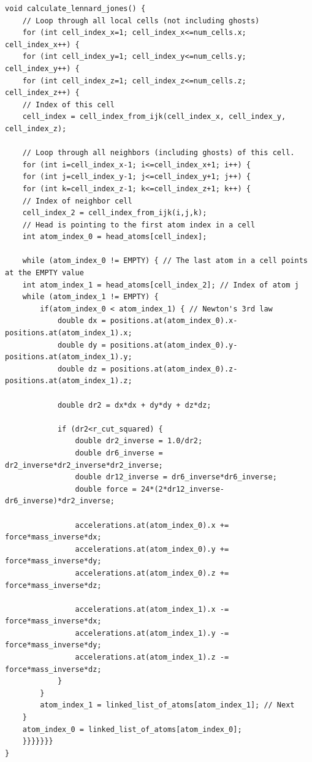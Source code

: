 \begin{lstlisting}[caption=Implementation of the Lennard-Jones force. The code loops over all cells and their neighbors computing the forces between all the atoms in neighboring cells., label=lst:md_lennard_jones]
void calculate_lennard_jones() {
    // Loop through all local cells (not including ghosts)
    for (int cell_index_x=1; cell_index_x<=num_cells.x; cell_index_x++) {
    for (int cell_index_y=1; cell_index_y<=num_cells.y; cell_index_y++) {
    for (int cell_index_z=1; cell_index_z<=num_cells.z; cell_index_z++) {
    // Index of this cell
    cell_index = cell_index_from_ijk(cell_index_x, cell_index_y, cell_index_z);

    // Loop through all neighbors (including ghosts) of this cell.
    for (int i=cell_index_x-1; i<=cell_index_x+1; i++) {
    for (int j=cell_index_y-1; j<=cell_index_y+1; j++) {
    for (int k=cell_index_z-1; k<=cell_index_z+1; k++) {
    // Index of neighbor cell
    cell_index_2 = cell_index_from_ijk(i,j,k);
    // Head is pointing to the first atom index in a cell
    int atom_index_0 = head_atoms[cell_index]; 

    while (atom_index_0 != EMPTY) { // The last atom in a cell points at the EMPTY value
    int atom_index_1 = head_atoms[cell_index_2]; // Index of atom j
    while (atom_index_1 != EMPTY) {
        if(atom_index_0 < atom_index_1) { // Newton's 3rd law
            double dx = positions.at(atom_index_0).x-positions.at(atom_index_1).x;
            double dy = positions.at(atom_index_0).y-positions.at(atom_index_1).y;
            double dz = positions.at(atom_index_0).z-positions.at(atom_index_1).z;
            
            double dr2 = dx*dx + dy*dy + dz*dz;

            if (dr2<r_cut_squared) {
                double dr2_inverse = 1.0/dr2;
                double dr6_inverse = dr2_inverse*dr2_inverse*dr2_inverse;
                double dr12_inverse = dr6_inverse*dr6_inverse;
                double force = 24*(2*dr12_inverse-dr6_inverse)*dr2_inverse;

                accelerations.at(atom_index_0).x += force*mass_inverse*dx;
                accelerations.at(atom_index_0).y += force*mass_inverse*dy;
                accelerations.at(atom_index_0).z += force*mass_inverse*dz;

                accelerations.at(atom_index_1).x -= force*mass_inverse*dx;
                accelerations.at(atom_index_1).y -= force*mass_inverse*dy;
                accelerations.at(atom_index_1).z -= force*mass_inverse*dz;
            }
        }
        atom_index_1 = linked_list_of_atoms[atom_index_1]; // Next
    }
    atom_index_0 = linked_list_of_atoms[atom_index_0];
    }}}}}}}
}
\end{lstlisting}